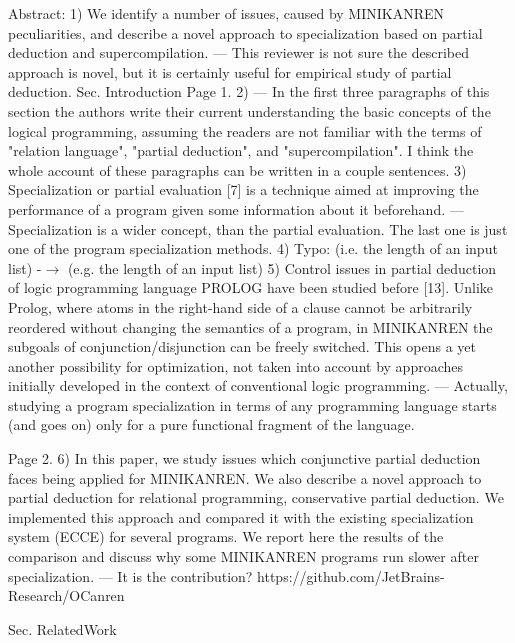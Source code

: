 Abstract:
1) We identify a number of issues, caused by MINIKANREN peculiarities, and describe a novel approach to specialization based on partial deduction and supercompilation.
 --- This reviewer is not sure the described approach is novel, but it is certainly useful for empirical study of partial deduction.
Sec. Introduction
Page 1.
2) --- In the first three paragraphs of this section the authors write their current understanding the basic concepts of the logical programming, assuming the readers are not familiar with the terms of  "relation language", "partial deduction", and "supercompilation". I think the whole account of these paragraphs can be written in a couple sentences.
3) Specialization or partial evaluation [7] is a technique aimed at improving the performance of a program given some information about it beforehand.
 --- Specialization is a wider concept, than the partial evaluation. The last one is just one of the program specialization methods.
4) Typo:
   (i.e. the length of an input list) -$\to$ (e.g. the length of an input list)
5) Control issues in partial deduction of logic programming language PROLOG have been studied before [13]. Unlike Prolog, where atoms in the right-hand side of a clause cannot be arbitrarily reordered without changing the semantics of a program, in MINIKANREN the subgoals of conjunction/disjunction can be freely switched. This opens a yet another possibility for optimization, not taken into account by approaches initially developed in the context of conventional logic programming.
 --- Actually, studying a program specialization in terms of any programming language starts (and goes on) only for a pure functional fragment of the language.

Page 2.
6) In this paper, we study issues which conjunctive partial deduction faces being applied for MINIKANREN. We also describe a novel approach to partial deduction for relational programming, conservative partial deduction. We implemented this approach and compared it with the existing specialization system (ECCE) for several programs. We report here the results of the comparison and discuss why some MINIKANREN programs run slower after specialization.
 --- It is the contribution? https://github.com/JetBrains-Research/OCanren

Sec. RelatedWork


